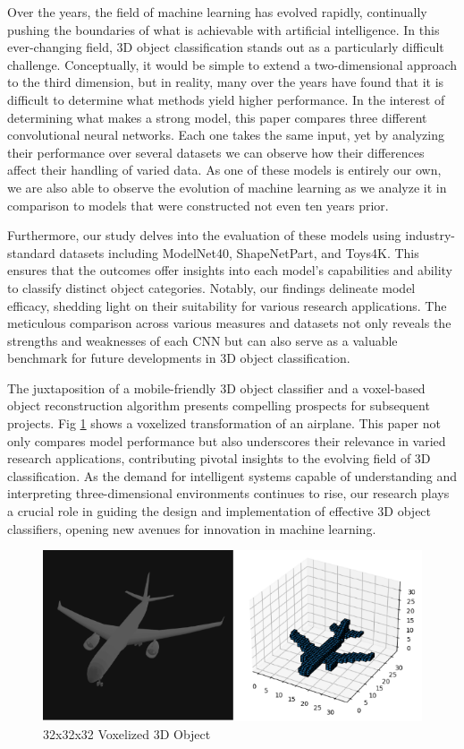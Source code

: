\documentclass[conference]{IEEEtran}
\begin{document}
Over the years, the field of machine learning has evolved rapidly, continually pushing the boundaries of what is achievable with artificial intelligence. In this ever-changing field, 3D object classification stands out as a particularly difficult challenge. Conceptually, it would be simple to extend a two-dimensional approach to the third dimension, but in reality, many over the years have found that it is difficult to determine what methods yield higher performance\cite{7353481}. In the interest of determining what makes a strong model, this paper compares three different convolutional neural networks. Each one takes the same input, yet by analyzing their performance over several datasets we can observe how their differences affect their handling of varied data. As one of these models is entirely our own, we are also able to observe the evolution of machine learning as we analyze it in comparison to models that were constructed not even ten years prior.

Furthermore, our study delves into the evaluation of these models using industry-standard datasets including ModelNet40, ShapeNetPart, and Toys4K. This ensures that the outcomes offer insights into each model's capabilities and ability to classify distinct object categories. Notably, our findings delineate model efficacy, shedding light on their suitability for various research applications. The meticulous comparison across various measures and datasets not only reveals the strengths and weaknesses of each CNN but can also serve as a valuable benchmark for future developments in 3D object classification.

The juxtaposition of a mobile-friendly 3D object classifier and a voxel-based object reconstruction algorithm\cite{math9182288} presents compelling prospects for subsequent projects. Fig \ref{fig:plane} shows a voxelized transformation of an airplane. This paper not only compares model performance but also underscores their relevance in varied research applications, contributing pivotal insights to the evolving field of 3D classification. As the demand for intelligent systems capable of understanding and interpreting three-dimensional environments continues to rise, our research plays a crucial role in guiding the design and implementation of effective 3D object classifiers, opening new avenues for innovation in machine learning.

\begin{figure}
    \centering
    \includegraphics[scale=0.5]{Images/airplane 3D.png}
    \caption{32x32x32 Voxelized 3D Object}
    \label{fig:plane}
\end{figure}
\end{document}
